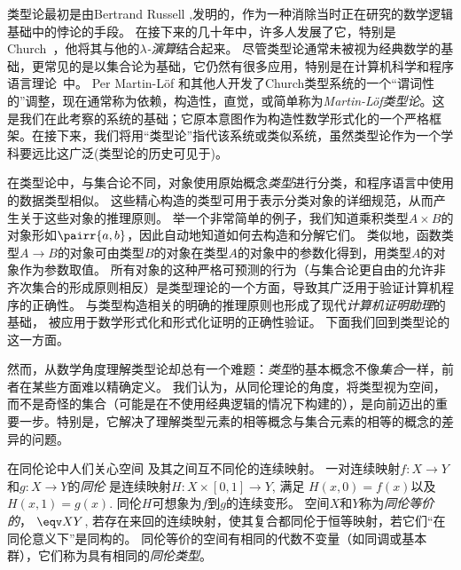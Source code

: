 类型论最初是由Bertrand Russell \cite{Russell:1908},发明的，作为一种消除当时正在研究的数学逻辑基础中的悖论的手段。
在接下来的几十年中，许多人发展了它，特别是Church~\cite{Church:1940tu,Church:1941tc}，他将其与他的\textit{$\lambda$-演算}结合起来。
尽管类型论通常未被视为经典数学的基础，更常见的是以集合论为基础，它仍然有很多应用，特别是在计算机科学和程序语言理论~\cite{Pierce-TAPL}中。
%
%
%
Per Martin-L\"{o}f \cite{Martin-Lof-1972,Martin-Lof-1973,Martin-Lof-1979,martin-lof:bibliopolis}和其他人开发了Church类型系统的一个“谓词性的”调整，现在通常称为依赖，构造性，直觉，或简单称为\emph{Martin\--L\"of类型论}。这是我们在此考察的系统的基础；它原本意图作为构造性数学形式化的一个严格框架。在接下来，我们将用“类型论”指代该系统或类似系统，虽然类型论作为一个学科要远比这广泛(类型论的历史可见于\cite{somma,kamar})。

在类型论中，与集合论不同，对象使用原始概念\emph{类型}进行分类，和程序语言中使用的数据类型相似。 这些精心构造的类型可用于表示分类对象的详细规范，从而产生关于这些对象的推理原则。 举一个非常简单的例子，我们知道乘积类型$A\times B$的对象形如$\pairr{a,b}$，因此自动地知道如何去构造和分解它们。 类似地，函数类型$A\to B$的对象可由类型$B$的对象在类型$A$的对象中的参数化得到，用类型$A$的对象作为参数取值。 所有对象的这种严格可预测的行为（与集合论更自由的允许非齐次集合的形成原则相反）是类型理论的一个方面，导致其广泛用于验证计算机程序的正确性。  与类型构造相关的明确的推理原则也形成了现代\emph{计算机证明助理}的基础，%
%
%
被应用于数学形式化和形式化证明的正确性验证。 下面我们回到类型论的这一方面。

然而，从数学角度理解类型论却总有一个难题：\emph{类型}的基本概念不像\emph{集合}一样，前者在某些方面难以精确定义。 我们认为，从同伦理论的角度，将类型视为空间，而不是奇怪的集合（可能是在不使用经典逻辑的情况下构建的），是向前迈出的重要一步。特别是，它解决了理解类型元素的相等概念与集合元素的相等的概念的差异的问题。

在同伦论中人们关心空间
%
及其之间互不同伦的连续映射。
%
一对连续映射$f : X \to Y$和$g : X\to Y$的\emph{同伦}
%
是连续映射$H : X \times [0, 1] \to Y$, 满足
$H(x, 0) = f (x)$以及$H(x, 1) = g(x)$. 同伦$H$可想象为$f$到$g$的连续变形。 空间$X$和$Y$称为\emph{同伦等价的}，
%
$\eqv X Y$, 若存在来回的连续映射，使其复合都同伦于恒等映射，若它们“在同伦意义下”是同构的。 同伦等价的空间有相同的代数不变量（如同调或基本群），它们称为具有相同的\emph{同伦类型}。

